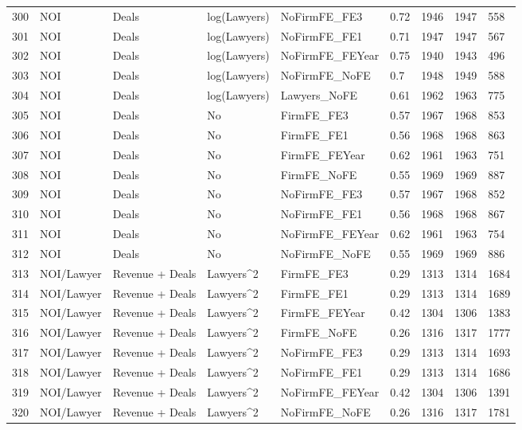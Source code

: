 \documentclass{article}
\begin{document}
\begin{table}[H]
\begin{tabular}{rllllllll}
  300 & NOI & Deals & log(Lawyers) & NoFirmFE\_FE3 & 0.72 & 1946 & 1947 & 558 \\ 
  301 & NOI & Deals & log(Lawyers) & NoFirmFE\_FE1 & 0.71 & 1947 & 1947 & 567 \\ 
  302 & NOI & Deals & log(Lawyers) & NoFirmFE\_FEYear & 0.75 & 1940 & 1943 & 496 \\ 
  303 & NOI & Deals & log(Lawyers) & NoFirmFE\_NoFE & 0.7 & 1948 & 1949 & 588 \\ 
  304 & NOI & Deals & log(Lawyers) & Lawyers\_NoFE & 0.61 & 1962 & 1963 & 775 \\ 
  305 & NOI & Deals & No & FirmFE\_FE3 & 0.57 & 1967 & 1968 & 853 \\ 
  306 & NOI & Deals & No & FirmFE\_FE1 & 0.56 & 1968 & 1968 & 863 \\ 
  307 & NOI & Deals & No & FirmFE\_FEYear & 0.62 & 1961 & 1963 & 751 \\ 
  308 & NOI & Deals & No & FirmFE\_NoFE & 0.55 & 1969 & 1969 & 887 \\ 
  309 & NOI & Deals & No & NoFirmFE\_FE3 & 0.57 & 1967 & 1968 & 852 \\ 
  310 & NOI & Deals & No & NoFirmFE\_FE1 & 0.56 & 1968 & 1968 & 867 \\ 
  311 & NOI & Deals & No & NoFirmFE\_FEYear & 0.62 & 1961 & 1963 & 754 \\ 
  312 & NOI & Deals & No & NoFirmFE\_NoFE & 0.55 & 1969 & 1969 & 886 \\ 
  313 & NOI/Lawyer & Revenue + Deals & Lawyers^2 & FirmFE\_FE3 & 0.29 & 1313 & 1314 & 1684 \\ 
  314 & NOI/Lawyer & Revenue + Deals & Lawyers^2 & FirmFE\_FE1 & 0.29 & 1313 & 1314 & 1689 \\ 
  315 & NOI/Lawyer & Revenue + Deals & Lawyers^2 & FirmFE\_FEYear & 0.42 & 1304 & 1306 & 1383 \\ 
  316 & NOI/Lawyer & Revenue + Deals & Lawyers^2 & FirmFE\_NoFE & 0.26 & 1316 & 1317 & 1777 \\ 
  317 & NOI/Lawyer & Revenue + Deals & Lawyers^2 & NoFirmFE\_FE3 & 0.29 & 1313 & 1314 & 1693 \\ 
  318 & NOI/Lawyer & Revenue + Deals & Lawyers^2 & NoFirmFE\_FE1 & 0.29 & 1313 & 1314 & 1686 \\ 
  319 & NOI/Lawyer & Revenue + Deals & Lawyers^2 & NoFirmFE\_FEYear & 0.42 & 1304 & 1306 & 1391 \\ 
  320 & NOI/Lawyer & Revenue + Deals & Lawyers^2 & NoFirmFE\_NoFE & 0.26 & 1316 & 1317 & 1781 \\ 
   \hline
\end{tabular}
\end{table}
\end{document}
